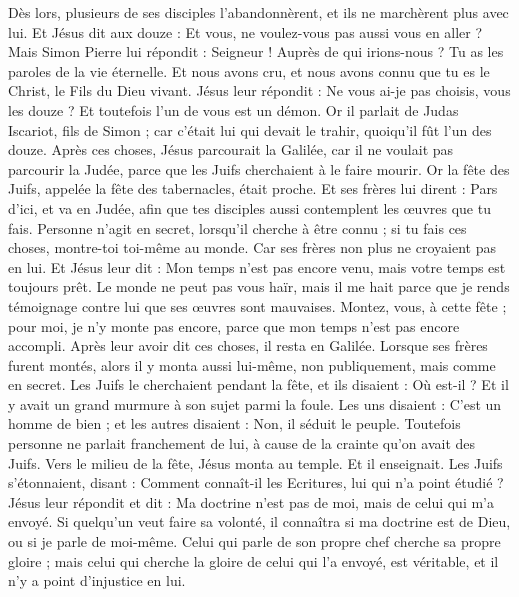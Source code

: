\begin{multicols}{2}
Dès lors, plusieurs de ses disciples l'abandonnèrent, et ils ne marchèrent plus avec lui.
Et Jésus dit aux douze : Et vous, ne voulez-vous pas aussi vous en aller ?
Mais Simon Pierre lui répondit : Seigneur ! Auprès de qui irions-nous ? Tu as les paroles de la vie éternelle.
Et nous avons cru, et nous avons connu que tu es le Christ, le Fils du Dieu vivant.
Jésus leur répondit : Ne vous ai-je pas choisis, vous les douze ? Et toutefois l'un de vous est un démon.
Or il parlait de Judas Iscariot, fils de Simon ; car c'était lui qui devait le trahir, quoiqu'il fût l'un des douze.
\VerseOne{}Après ces choses, Jésus parcourait la Galilée, car il ne voulait pas parcourir la Judée, parce que les Juifs cherchaient à le faire mourir.
Or la fête des Juifs, appelée la fête des tabernacles, était proche.
Et ses frères lui dirent : Pars d'ici, et va en Judée, afin que tes disciples aussi contemplent les œuvres que tu fais.
Personne n'agit en secret, lorsqu'il cherche à être connu ; si tu fais ces choses, montre-toi toi-même au monde.
Car ses frères non plus ne croyaient pas en lui.
Et Jésus leur dit : Mon temps n'est pas encore venu, mais votre temps est toujours prêt.
Le monde ne peut pas vous haïr, mais il me hait parce que je rends témoignage contre lui que ses œuvres sont mauvaises.
Montez, vous, à cette fête ; pour moi, je n'y monte pas encore, parce que mon temps n'est pas encore accompli.
Après leur avoir dit ces choses, il resta en Galilée.
Lorsque ses frères furent montés, alors il y monta aussi lui-même, non publiquement, mais comme en secret.
Les Juifs le cherchaient pendant la fête, et ils disaient : Où est-il ?
Et il y avait un grand murmure à son sujet parmi la foule. Les uns disaient : C'est un homme de bien ; et les autres disaient : Non, il séduit le peuple.
Toutefois personne ne parlait franchement de lui, à cause de la crainte qu'on avait des Juifs.
Vers le milieu de la fête, Jésus monta au temple. Et il enseignait.
Les Juifs s'étonnaient, disant : Comment connaît-il les Ecritures, lui qui n'a point étudié ?
Jésus leur répondit et dit : Ma doctrine n'est pas de moi, mais de celui qui m'a envoyé.
Si quelqu'un veut faire sa volonté, il connaîtra si ma doctrine est de Dieu, ou si je parle de moi-même.
Celui qui parle de son propre chef cherche sa propre gloire ; mais celui qui cherche la gloire de celui qui l'a envoyé, est véritable, et il n'y a point d'injustice en lui.

\end{multicols}
